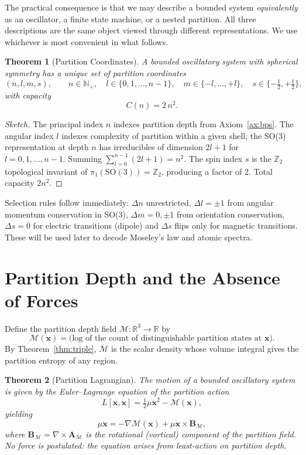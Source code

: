 \documentclass[11pt,a4paper]{article}
\newtheorem{theorem}{Theorem}[section]
\theoremstyle{definition}
\theoremstyle{remark}
\newcommand{\Depth}{\mathcal{M}}
\newcommand{\Real}{\mathbb{R}}
\newcommand{\Natural}{\mathbb{N}}
\begin{document}
The practical consequence is that we may describe a bounded system \emph{equivalently} as an oscillator, a finite state machine, or a nested partition. All three descriptions are the same object viewed through different representations. We use whichever is most convenient in what follows.

\begin{theorem}[Partition Coordinates]
\label{thm:partcoords}
A bounded oscillatory system with spherical symmetry has a unique set of partition coordinates
\[
(n,l,m,s), \qquad n\in\Natural_+, \quad l\in\{0,1,\dots,n-1\}, \quad m\in\{-l,\dots,+l\}, \quad s\in\{-\tfrac12,+\tfrac12\},
\]
with capacity
\[
C(n) = 2\,n^2.
\]
\end{theorem}

\begin{proof}[Sketch]
The principal index $n$ indexes partition depth from Axiom~\ref{ax:bps}. The angular index $l$ indexes complexity of partition within a given shell; the SO(3) representation at depth $n$ has irreducibles of dimension $2l+1$ for $l=0,1,\dots,n-1$. Summing $\sum_{l=0}^{n-1}(2l+1) = n^2$. The spin index $s$ is the $\mathbb{Z}_2$ topological invariant of $\pi_1(\mathrm{SO}(3)) = \mathbb{Z}_2$, producing a factor of 2. Total capacity $2n^2$.
\end{proof}

Selection rules follow immediately: $\Delta n$ unrestricted, $\Delta l = \pm 1$ from angular momentum conservation in SO(3), $\Delta m = 0, \pm 1$ from orientation conservation, $\Delta s = 0$ for electric transitions (dipole) and $\Delta s$ flips only for magnetic transitions. These will be used later to decode Moseley's law and atomic spectra.

\section{Partition Depth and the Absence of Forces}
\label{sec:depth}

Define the partition depth field $\Depth: \Real^3 \to \Real$ by
\[
\Depth(\mathbf{x}) = \text{(log of the count of distinguishable partition states at } \mathbf{x}).
\]
By Theorem~\ref{thm:triple}, $\Depth$ is the scalar density whose volume integral gives the partition entropy of any region.

\begin{theorem}[Partition Lagrangian]
\label{thm:lagrangian}
The motion of a bounded oscillatory system is given by the Euler--Lagrange equation of the partition action
\[
L[\mathbf{x},\dot{\mathbf{x}}] = \tfrac12\mu\dot{\mathbf{x}}^2 - \Depth(\mathbf{x}),
\]
yielding
\[
\mu\ddot{\mathbf{x}} = -\nabla \Depth(\mathbf{x}) + \mu\dot{\mathbf{x}}\times \mathbf{B}_\Depth,
\]
where $\mathbf{B}_\Depth = \nabla\times\mathbf{A}_\Depth$ is the rotational (vortical) component of the partition field. No force is postulated: the equation arises from least-action on partition depth.
\end{theorem}
\end{document}
